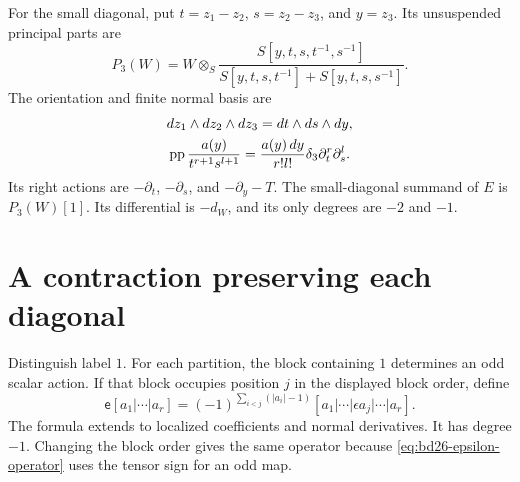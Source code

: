 For the small diagonal, put $t=z_1-z_2$, $s=z_2-z_3$, and $y=z_3$.
Its unsuspended principal parts are
\[
 P_3(W)=W\otimes_S
 \frac{S[y,t,s,t^{-1},s^{-1}]}
 {S[y,t,s,t^{-1}]+S[y,t,s,s^{-1}]}.
\]
The orientation and finite normal basis are
\begin{equation}\label{eq:bd26-small}
 \begin{gathered}
 dz_1\wedge dz_2\wedge dz_3=dt\wedge ds\wedge dy,\\
 \operatorname{pp}\frac{a(y)}{t^{r+1}s^{l+1}}
 =\frac{a(y)\,dy}{r!l!}\delta_3\partial_t^r\partial_s^l.
 \end{gathered}
\end{equation}
Its right actions are $-\partial_t$, $-\partial_s$, and $-\partial_y-T$.
The small-diagonal summand of $E$ is $P_3(W)[1]$.
Its differential is $-d_W$, and its only degrees are $-2$ and $-1$.

\section{A contraction preserving each diagonal}

Distinguish label $1$.
For each partition, the block containing $1$ determines an odd scalar action.
If that block occupies position $j$ in the displayed block order, define
\begin{equation}\label{eq:bd26-epsilon-operator}
 \mathsf e[a_1|\cdots|a_r]
 =(-1)^{\sum_{i<j}(|a_i|-1)}
 [a_1|\cdots|\epsilon a_j|\cdots|a_r].
\end{equation}
The formula extends to localized coefficients and normal derivatives.
It has degree $-1$.
Changing the block order gives the same operator because \eqref{eq:bd26-epsilon-operator} uses the tensor sign for an odd map.

